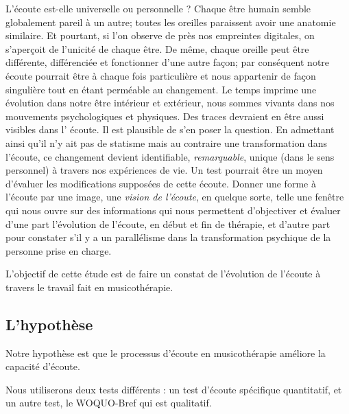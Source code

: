 L'écoute est-elle universelle ou personnelle ?
 Chaque être humain semble  globalement pareil à un autre; toutes les oreilles 
paraissent  avoir une anatomie similaire. Et pourtant, si l'on observe de près 
nos empreintes digitales, on s'aperçoit de l'unicité de chaque être. De même, 
chaque oreille peut être différente, différenciée et  fonctionner d'une autre 
façon;  par conséquent notre  écoute pourrait être à chaque fois particulière 
et nous appartenir de façon singulière tout en étant perméable au changement.
Le temps imprime une évolution dans notre être intérieur et extérieur, nous 
sommes vivants dans nos mouvements psychologiques et physiques. Des traces 
devraient en être aussi visibles dans l' écoute. Il est plausible de s'en poser 
la question.
En admettant ainsi qu'il n'y ait pas de statisme mais au contraire une 
transformation dans l'écoute, ce changement devient identifiable, 
\textit{remarquable}, unique (dans le sens personnel) à travers nos expériences 
de vie.  Un test pourrait être un moyen d'évaluer les modifications supposées 
de cette écoute. 
Donner une forme à l'écoute par une image, une \emph{vision de l'écoute}, en 
quelque sorte, telle une fenêtre qui nous ouvre sur des informations qui nous 
permettent d'objectiver et évaluer d'une part 
 l'évolution de l'écoute, en début et fin de thérapie, et d'autre part pour 
constater s'il y a un parallélisme dans la transformation psychique  de la 
personne prise en charge.

L'objectif de cette étude est de faire un constat de l'évolution de l'écoute à travers le travail fait en 
musicothérapie. 


\subsection{L'hypothèse}

Notre hypothèse est que le processus d'écoute en musicothérapie améliore la capacité d'écoute.
	
Nous utiliserons deux tests différents : 
un test d'écoute spécifique quantitatif, 
et un autre test, le WOQUO-Bref qui est qualitatif.

